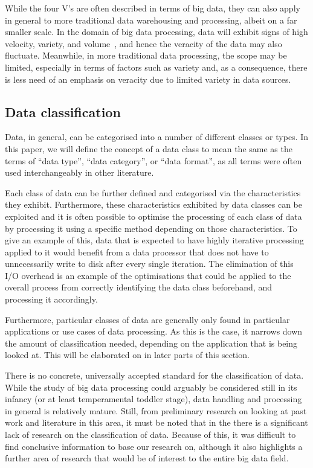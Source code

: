 \documentclass[a4paper,11pt]{article}
\begin{document}
While the four V's are often described in terms of big data, they can also apply in general to more traditional data
warehousing and processing, albeit on a far smaller scale. In the domain of big data processing, data will
exhibit signs of high velocity, variety, and volume~\cite{beyer2011gartner}, and hence the veracity of the data may also fluctuate. Meanwhile,
in more traditional data processing, the scope may be limited, especially in terms of factors such as variety and, as a
consequence, there is less need of an emphasis on veracity due to limited variety in data sources.


\subsection{Data classification} %
\label{sub:data_classification}

Data, in general, can be categorised into a number of different classes or types. In this paper, we will define the
concept of a data class to mean the same as the terms of ``data type'', ``data category'', or ``data format'', as all terms were often
used interchangeably in other literature.

Each class of data can be further defined and categorised via the characteristics they exhibit. Furthermore, these
characteristics exhibited by data classes can be exploited and it is often possible to optimise the processing of each
class of data by processing it using a specific method depending on those characteristics.%
To give an example of this, data that is expected to have highly iterative
processing applied to it would benefit from a data processor that does not have to unnecessarily write to disk after
every single iteration. The elimination of this I/O overhead is an example of the optimisations that could be applied to
the overall process from correctly identifying the data class beforehand, and processing it accordingly.

Furthermore, particular classes of data are generally only found in particular applications or use cases of data
processing.%
As this is the case, it narrows down the amount of classification needed, depending on the application that
is being looked at. This will be elaborated on in later parts of this section.

There is no concrete, universally accepted standard for the classification of data. While the study of big data processing
could arguably be considered still in its infancy (or at least temperamental toddler stage), data handling and processing
in general is relatively mature. Still, from preliminary research on looking at past work and literature in this area,
it must be noted that in the there is a significant lack of research on the classification of data. Because of this, it was
difficult to find conclusive information to base our research on, although it also highlights a further area
of research that would be of interest to the entire big data field.
\end{document}
